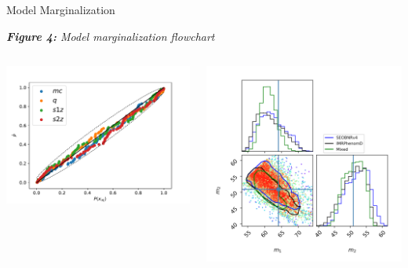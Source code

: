 \documentclass[serif]{beamer}
\begin{document}
\begin{frame}{}
\begin{columns}
\begin{column}[T]{0.3\textwidth}
\begin{block}{Model Marginalization}
\begin{center}
\small{\emph{\textbf{Figure 4:} Model marginalization flowchart}}
\end{center}

\vspace{-.5em}
\begin{center}
    \begin{columns}
      \begin{column}{0.45\textwidth}
        \includegraphics[scale=1.1]{Images/output_pp}
      \end{column}
       
      \begin{column}{0.45\textwidth}
       \includegraphics[scale=1.4]{Images/corner_m1_m2_event_65}
      \end{column}
    \end{columns}




\end{center}
\end{block}
\end{column}
\end{columns}
\end{frame}
\end{document}
